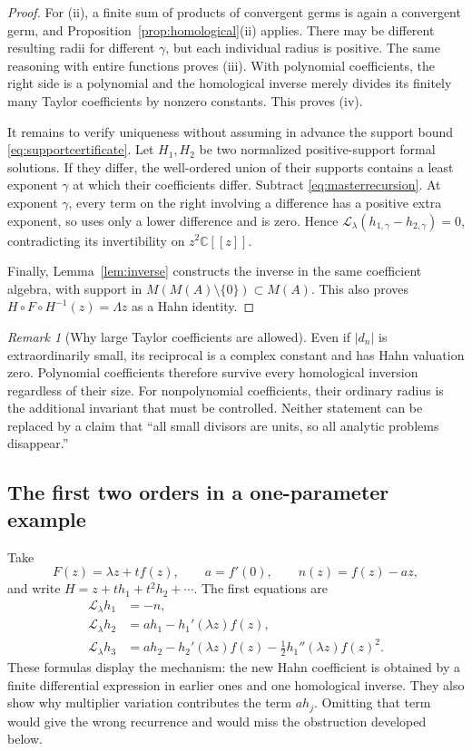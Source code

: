 \documentclass[11pt,a4paper]{article}
\numberwithin{equation}{section}
\theoremstyle{definition}
\theoremstyle{remark}
\newtheorem{remark}[theorem]{Remark}
\newcommand{\C}{\mathbb C}
\newcommand{\LL}{\mathcal L}
\begin{document}
\begin{proof}
For (ii), a finite sum of products of convergent germs is again a
convergent germ, and Proposition~\ref{prop:homological}(ii) applies.
There may be different resulting radii for different $\gamma$, but each
individual radius is positive. The same reasoning with entire functions
proves (iii). With polynomial coefficients, the right side is a polynomial
and the homological inverse merely divides its finitely many Taylor
coefficients by nonzero constants. This proves (iv).

It remains to verify uniqueness without assuming in advance the support
bound \eqref{eq:supportcertificate}. Let $H_1,H_2$ be two normalized
positive-support formal solutions. If they differ, the well-ordered union
of their supports contains a least exponent $\gamma$ at which their
coefficients differ. Subtract \eqref{eq:masterrecursion}. At exponent
$\gamma$, every term on the right involving a difference has a positive
extra exponent, so uses only a lower difference and is zero. Hence
$\LL_\lambda(h_{1,\gamma}-h_{2,\gamma})=0$, contradicting its
invertibility on $z^2\C[[z]]$.

Finally, Lemma~\ref{lem:inverse} constructs the inverse in the same
coefficient algebra, with support in
$M(M(A)\setminus\{0\})\subset M(A)$. This also proves
$H\circ F\circ H^{-1}(z)=\Lambda z$ as a Hahn identity.
\end{proof}

\begin{remark}[Why large Taylor coefficients are allowed]
Even if $|d_n|$ is extraordinarily small, its reciprocal is a complex
constant and has Hahn valuation zero. Polynomial coefficients therefore
survive every homological inversion regardless of their size. For
nonpolynomial coefficients, their ordinary radius is the additional
invariant that must be controlled. Neither statement can be replaced by a
claim that ``all small divisors are units, so all analytic problems disappear.''
\end{remark}

\subsection{The first two orders in a one-parameter example}

Take
\[
 F(z)=\lambda z+t f(z),\qquad
 a=f'(0),\qquad n(z)=f(z)-az,
\]
and write $H=z+t h_1+t^2h_2+\cdots$. The first equations are
\begin{align}
 \LL_\lambda h_1&=-n,\label{eq:firstorder}\\
 \LL_\lambda h_2&=a h_1-h_1'(\lambda z)f(z),\label{eq:secondorder}\\
 \LL_\lambda h_3&=a h_2-h_2'(\lambda z)f(z)
                   -\tfrac12 h_1''(\lambda z)f(z)^2.
\end{align}
These formulas display the mechanism: the new Hahn coefficient is obtained
by a finite differential expression in earlier ones and one homological
inverse. They also show why multiplier variation contributes the term
$a h_j$. Omitting that term would give the wrong recurrence and would miss
the obstruction developed below.
\end{document}
